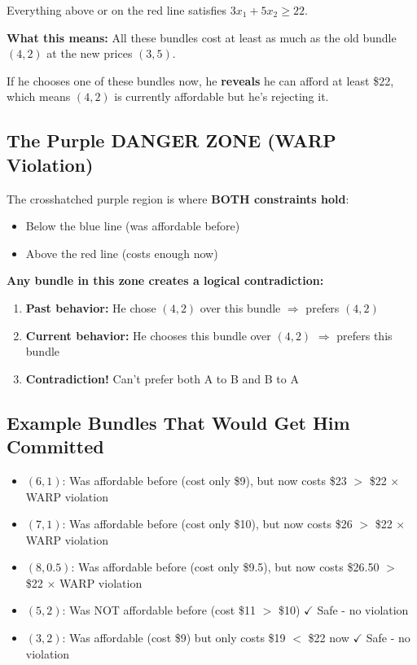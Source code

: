 \documentclass[11pt]{article}
\begin{document}
Everything above or on the red line satisfies $3x_1 + 5x_2 \geq 22$.

\textbf{What this means:} All these bundles cost at least as much as the old bundle $(4,2)$ at the new prices $(3,5)$.

If he chooses one of these bundles now, he \textbf{reveals} he can afford at least \$22, which means $(4,2)$ is currently affordable but he's rejecting it.

\subsection{The Purple DANGER ZONE (WARP Violation)}

The crosshatched purple region is where \textbf{BOTH constraints hold}:
\begin{itemize}
\item Below the blue line (was affordable before)
\item Above the red line (costs enough now)
\end{itemize}

\textbf{Any bundle in this zone creates a logical contradiction:}

\begin{enumerate}
\item \textbf{Past behavior:} He chose $(4,2)$ over this bundle $\Rightarrow$ prefers $(4,2)$
\item \textbf{Current behavior:} He chooses this bundle over $(4,2)$ $\Rightarrow$ prefers this bundle
\item \textbf{Contradiction!} Can't prefer both A to B and B to A
\end{enumerate}

\subsection{Example Bundles That Would Get Him Committed}

\begin{itemize}
\item $(6, 1)$: Was affordable before (cost only \$9), but now costs \$23 $>$ \$22 $\times$ WARP violation
\item $(7, 1)$: Was affordable before (cost only \$10), but now costs \$26 $>$ \$22 $\times$ WARP violation
\item $(8, 0.5)$: Was affordable before (cost only \$9.5), but now costs \$26.50 $>$ \$22 $\times$ WARP violation
\item $(5, 2)$: Was NOT affordable before (cost \$11 $>$ \$10) $\checkmark$ Safe - no violation
\item $(3, 2)$: Was affordable (cost \$9) but only costs \$19 $<$ \$22 now $\checkmark$ Safe - no violation
\end{itemize}
\end{document}
